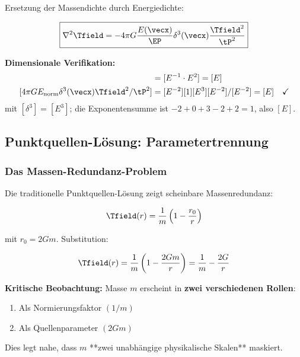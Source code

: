 	Ersetzung der Massendichte durch Energiedichte:
	
	\begin{equation}
		\boxed{\nabla^2 \Tfield = -4\pi G \frac{E(\vecx)}{\EP} \delta^3(\vecx) \frac{\Tfield^2}{\tP^2}}
		\label{eq:field_equation_mass_free}
	\end{equation}
	
	\textbf{Dimensionale Verifikation:}
	\begin{align}
		[\nabla^2 \Tfield] &= [E^{-1} \cdot E^2] = [E] \\
		[4\pi G E_{\text{norm}} \delta^3(\vecx) \Tfield^2/\tP^2] &= [E^{-2}][1][E^3][E^{-2}]/[E^{-2}] = [E] \quad \checkmark
	\end{align}
	mit $[\delta^3]=[E^3]$; die Exponentensumme ist $-2+0+3-2+2=1$, also $[E]$.
	
	\subsection{Punktquellen-Lösung: Parametertrennung}
	\label{subsec:point_source_elimination}
	
	\subsubsection{Das Massen-Redundanz-Problem}
	
	Die traditionelle Punktquellen-Lösung zeigt scheinbare Massenredundanz:
	
	\begin{equation}
		\Tfield(r) = \frac{1}{m}\left(1 - \frac{r_0}{r}\right)
		\label{eq:point_source_original}
	\end{equation}
	
	mit $r_0 = 2Gm$. Substitution:
	
	\begin{equation}
		\Tfield(r) = \frac{1}{m}\left(1 - \frac{2Gm}{r}\right) = \frac{1}{m} - \frac{2G}{r}
		\label{eq:mass_redundancy}
	\end{equation}
	
	\textbf{Kritische Beobachtung:} Masse $m$ erscheint in \textbf{zwei verschiedenen Rollen}:
	\begin{enumerate}
		\item Als Normierungsfaktor $(1/m)$
		\item Als Quellenparameter $(2Gm)$
	\end{enumerate}
	
	Dies legt nahe, dass $m$ **zwei unabhängige physikalische Skalen** maskiert.
	
